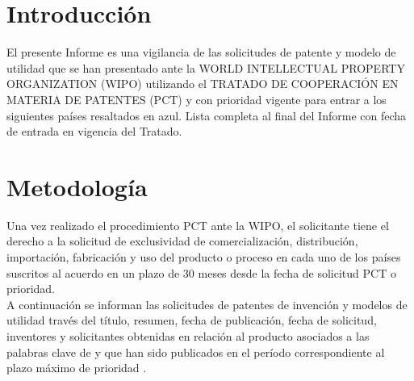 \documentclass[12pt,openany]{book} %
\begin{document}
\chapter{Introducción}
El presente Informe es una vigilancia de las solicitudes de patente y modelo de utilidad que se han presentado ante la WORLD INTELLECTUAL PROPERTY ORGANIZATION (WIPO) utilizando el TRATADO DE COOPERACIÓN EN MATERIA DE PATENTES (PCT) y con prioridad vigente para entrar a los siguientes países resaltados en azul. Lista completa al final del Informe con fecha de entrada en vigencia del Tratado.



\chapter{Metodología}
Una vez realizado el procedimiento PCT ante la WIPO, el solicitante tiene el derecho a la solicitud de exclusividad de comercialización, distribución, importación, fabricación y uso del producto o proceso en cada uno de los países suscritos al acuerdo en un plazo de 30 meses desde la fecha de solicitud PCT o prioridad.\\

A continuación se informan las solicitudes de patentes de invención y modelos de utilidad través del título, resumen, fecha de publicación, fecha de solicitud, inventores y solicitantes obtenidas en relación al producto \textsc{\Producto} asociados a las palabras clave \textsc{\Keywords} de \textsc{\Cliente} y que han sido publicados en el período correspondiente al plazo máximo de prioridad \textsc{\Periodo}.


\end{document}
